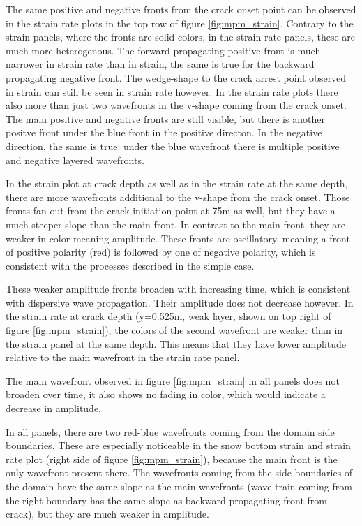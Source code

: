 The same positive and negative fronts from the crack onset point can be observed in the strain rate plots in the top row of figure \ref{fig:mpm_strain}. Contrary to the strain panels, where the fronts are solid colors, in the strain rate panels, these are much more heterogenous. The forward propagating positive front is much narrower in strain rate than in strain, the same is true for the backward propagating negative front. The wedge-shape to the crack arrest point observed in strain can still be seen in strain rate however. In the strain rate plots there also more than just two wavefronts in the v-shape coming from the crack onset. The main positive and negative fronts are still visible, but there is another positve front under the blue front in the positive directon. In the negative direction, the same is true: under the blue wavefront there is multiple positive and negative layered wavefronts. \par

In the strain plot at crack depth as well as in the strain rate at the same depth, there are more wavefronts additional to the v-shape from the crack onset. Those fronts fan out from the crack initiation point at 75m as well, but they have a much steeper slope than the main front. In contrast to the main front, they are weaker in color meaning amplitude. These fronts are oscillatory, meaning a front of positive polarity (red) is followed by one of negative polarity, which is consistent with the processes described in the simple case. \par

These weaker amplitude fronts broaden with increasing time, which is consistent with dispersive wave propagation. Their amplitude does not decrease however. In the strain rate at crack depth (y=0.525m, weak layer, shown on top right of figure \ref{fig:mpm_strain}), the colors of the second wavefront are weaker than in the strain panel at the same depth. This means that they have lower amplitude relative to the main wavefront in the strain rate panel. \par

The main wavefront observed in figure \ref{fig:mpm_strain} in all panels does not broaden over time, it also shows no fading in color, which would indicate a decrease in amplitude. \par 

In all panels, there are two red-blue wavefronts coming from the domain side boundaries. These are especially noticeable in the snow bottom strain and strain rate plot (right side of figure \ref{fig:mpm_strain}), because the main front is the only wavefront present there. The wavefronts coming from the side boundaries of the domain have the same slope as the main wavefronts (wave train coming from the right boundary has the same slope as backward-propagating front from crack), but they are much weaker in amplitude. \par 

